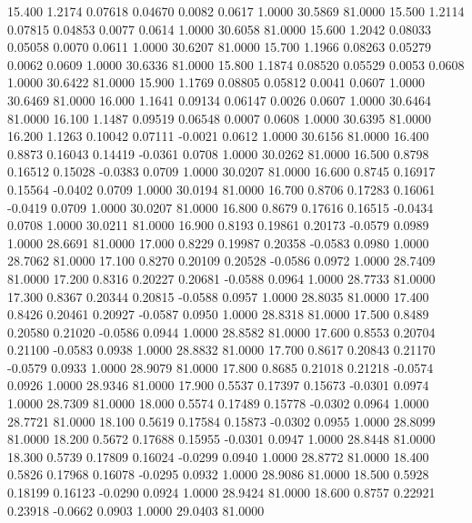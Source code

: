   15.400   1.2174   0.07618   0.04670   0.0082   0.0617   1.0000  30.5869  81.0000
  15.500   1.2114   0.07815   0.04853   0.0077   0.0614   1.0000  30.6058  81.0000
  15.600   1.2042   0.08033   0.05058   0.0070   0.0611   1.0000  30.6207  81.0000
  15.700   1.1966   0.08263   0.05279   0.0062   0.0609   1.0000  30.6336  81.0000
  15.800   1.1874   0.08520   0.05529   0.0053   0.0608   1.0000  30.6422  81.0000
  15.900   1.1769   0.08805   0.05812   0.0041   0.0607   1.0000  30.6469  81.0000
  16.000   1.1641   0.09134   0.06147   0.0026   0.0607   1.0000  30.6464  81.0000
  16.100   1.1487   0.09519   0.06548   0.0007   0.0608   1.0000  30.6395  81.0000
  16.200   1.1263   0.10042   0.07111  -0.0021   0.0612   1.0000  30.6156  81.0000
  16.400   0.8873   0.16043   0.14419  -0.0361   0.0708   1.0000  30.0262  81.0000
  16.500   0.8798   0.16512   0.15028  -0.0383   0.0709   1.0000  30.0207  81.0000
  16.600   0.8745   0.16917   0.15564  -0.0402   0.0709   1.0000  30.0194  81.0000
  16.700   0.8706   0.17283   0.16061  -0.0419   0.0709   1.0000  30.0207  81.0000
  16.800   0.8679   0.17616   0.16515  -0.0434   0.0708   1.0000  30.0211  81.0000
  16.900   0.8193   0.19861   0.20173  -0.0579   0.0989   1.0000  28.6691  81.0000
  17.000   0.8229   0.19987   0.20358  -0.0583   0.0980   1.0000  28.7062  81.0000
  17.100   0.8270   0.20109   0.20528  -0.0586   0.0972   1.0000  28.7409  81.0000
  17.200   0.8316   0.20227   0.20681  -0.0588   0.0964   1.0000  28.7733  81.0000
  17.300   0.8367   0.20344   0.20815  -0.0588   0.0957   1.0000  28.8035  81.0000
  17.400   0.8426   0.20461   0.20927  -0.0587   0.0950   1.0000  28.8318  81.0000
  17.500   0.8489   0.20580   0.21020  -0.0586   0.0944   1.0000  28.8582  81.0000
  17.600   0.8553   0.20704   0.21100  -0.0583   0.0938   1.0000  28.8832  81.0000
  17.700   0.8617   0.20843   0.21170  -0.0579   0.0933   1.0000  28.9079  81.0000
  17.800   0.8685   0.21018   0.21218  -0.0574   0.0926   1.0000  28.9346  81.0000
  17.900   0.5537   0.17397   0.15673  -0.0301   0.0974   1.0000  28.7309  81.0000
  18.000   0.5574   0.17489   0.15778  -0.0302   0.0964   1.0000  28.7721  81.0000
  18.100   0.5619   0.17584   0.15873  -0.0302   0.0955   1.0000  28.8099  81.0000
  18.200   0.5672   0.17688   0.15955  -0.0301   0.0947   1.0000  28.8448  81.0000
  18.300   0.5739   0.17809   0.16024  -0.0299   0.0940   1.0000  28.8772  81.0000
  18.400   0.5826   0.17968   0.16078  -0.0295   0.0932   1.0000  28.9086  81.0000
  18.500   0.5928   0.18199   0.16123  -0.0290   0.0924   1.0000  28.9424  81.0000
  18.600   0.8757   0.22921   0.23918  -0.0662   0.0903   1.0000  29.0403  81.0000
